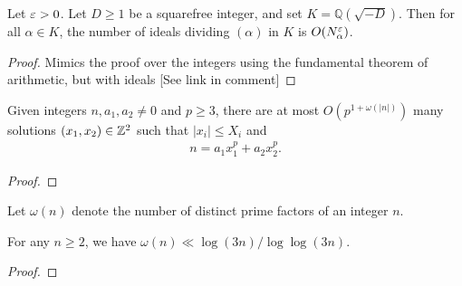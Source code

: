 \begin{lemma} \label{lem:DivisorBoundQuadField}
  Let $\varepsilon>0$. Let $D\ge1$ be a squarefree integer, and set $K=\mathbb{Q}(\sqrt{-D})$.
  Then for all $\alpha\in K$, the number of ideals dividing $(\alpha)$ in $K$
  is $O(N_\alpha^\varepsilon)$.
\end{lemma}
\begin{proof}
  Mimics the proof over the integers
  using the fundamental theorem of arithmetic, but with ideals
  [See link in comment] %
\end{proof}

\begin{theorem} \label{thm:BombierSchmidtforThueEqs}
  Given integers $n,a_1,a_2\neq0$ and $p\ge3$, there are
  at most $O(p^{1+\omega(|n|)})$ many solutions
  $(x_1,x_2)\in\mathbb{Z}^2$ such that $|x_i|\le X_i$ and
  \begin{align*}
    n = a_1 x_1^p + a_2 x_2^p.
  \end{align*}
\end{theorem}
\begin{proof}
\end{proof}


\begin{definition}\label{def:omega}
Let $\omega(n)$ denote the number of distinct prime factors of an integer $n$.
\end{definition}

\begin{lemma} \label{lem:omegaUpperBound} 
For any $n\ge2$, we have $\omega(n) \ll \log(3n)/\log\log(3n)$.
\end{lemma}
\begin{proof}
\end{proof}

